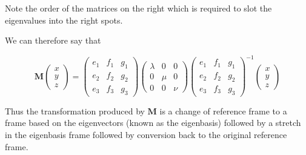 \documentclass[a5paper]{article}
\begin{document}
Note the order of the matrices on the right which is required to slot the
eigenvalues into the right spots.

We can therefore say that

\begin{equation}
  \bm{M}\left(
  \begin{array}{c}
    x \\ y \\ z
  \end{array} \right) =
  \left( \begin{array}{ccc}
    e_1 & f_1 & g_1\\
    e_2 & f_2 & g_2\\
    e_3 & f_3 & g_3
  \end{array} \right)
  \left( \begin{array}{ccc}
    \lambda & 0 & 0\\
    0 & \mu & 0\\
    0 & 0 & \nu
  \end{array} \right)
  \left( \begin{array}{ccc}
    e_1 & f_1 & g_1\\
    e_2 & f_2 & g_2\\
    e_3 & f_3 & g_3
  \end{array} \right)^{-1}
  \left( \begin{array}{c}
    x \\ y \\ z
  \end{array} \right)
\end{equation}

Thus the transformation produced by $\bm{M}$ is a change of reference frame to a
frame based on the eigenvectors (known as the eigenbasis) followed by a stretch
in the eigenbasis frame followed by conversion back to the original reference
frame.
\end{document}
